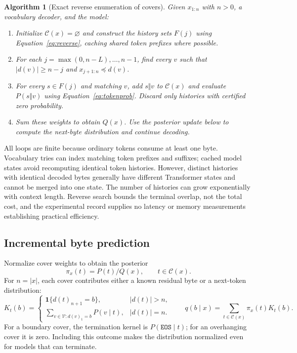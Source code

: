 \documentclass{article}
\newtheorem{algorithm}{Algorithm}
\newcommand{\vocab}{\mathcal{V}}
\newcommand{\cover}{\mathcal{C}}
\newcommand{\decode}{d}
\newcommand{\eos}{\mathtt{EOS}}
\begin{document}
\begin{algorithm}[Exact reverse enumeration of covers]
\label{alg:search}
\normalfont
Given $x_{1:n}$ with $n>0$, a vocabulary decoder, and the model:
\begin{enumerate}
\item Initialize $\cover(x)=\varnothing$ and construct the history sets $F(j)$ using Equation~\ref{eq:reverse}, caching shared token prefixes where possible.
\item For each $j=\max(0,n-L),\ldots,n-1$, find every $v$ such that $|\decode(v)|\geq n-j$ and $x_{j+1:n}\preceq\decode(v)$.
\item For every $s\in F(j)$ and matching $v$, add $s\Vert v$ to $\cover(x)$ and evaluate $P(s\Vert v)$ using Equation~\ref{eq:tokenprob}. Discard only histories with certified zero probability.
\item Sum these weights to obtain $Q(x)$. Use the posterior update below to compute the next-byte distribution and continue decoding.
\end{enumerate}
\end{algorithm}

All loops are finite because ordinary tokens consume at least one byte. Vocabulary tries can index matching token prefixes and suffixes; cached model states avoid recomputing identical token histories. However, distinct histories with identical decoded bytes generally have different Transformer states and cannot be merged into one state. The number of histories can grow exponentially with context length. Reverse search bounds the terminal overlap, not the total cost, and the experimental record supplies no latency or memory measurements establishing practical efficiency.

\subsection{Incremental byte prediction}
\label{sec:update}
Normalize cover weights to obtain the posterior
\begin{equation}
 \pi_x(t)=P(t)/Q(x),\qquad t\in\cover(x).
 \label{eq:posterior}
\end{equation}
For $n=|x|$, each cover contributes either a known residual byte or a next-token distribution:
\begin{equation}
 K_t(b)=
 \begin{cases}
 \mathbf{1}\{\decode(t)_{n+1}=b\},& |\decode(t)|>n,\\
 \displaystyle\sum_{v\in\vocab:\decode(v)_1=b}P(v\mid t),& |\decode(t)|=n.
 \end{cases}
 \qquad
 q(b\mid x)=\sum_{t\in\cover(x)}\pi_x(t)K_t(b).
 \label{eq:kernel}
\end{equation}
For a boundary cover, the termination kernel is $P(\eos\mid t)$; for an overhanging cover it is zero. Including this outcome makes the distribution normalized even for models that can terminate.
\end{document}
